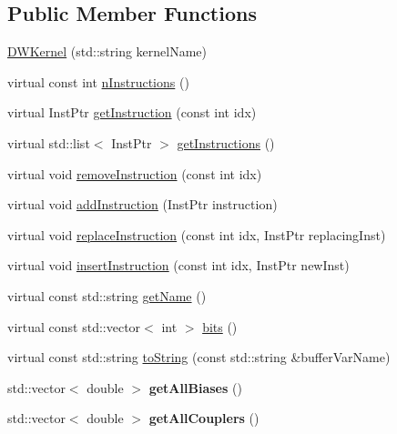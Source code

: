 \subsection*{Public Member Functions}
\begin{DoxyCompactItemize}
\item 
\hyperlink{a00032_a76a4dfadb973abbc93d1afefc6839ad8}{D\+W\+Kernel} (std\+::string kernel\+Name)
\item 
virtual const int \hyperlink{a00032_a79aecc7419a20b8779372ef36fc24806}{n\+Instructions} ()
\item 
virtual Inst\+Ptr \hyperlink{a00032_a00f23cd2e15ea6b9d00d4f3dbe1540f8}{get\+Instruction} (const int idx)
\item 
virtual std\+::list$<$ Inst\+Ptr $>$ \hyperlink{a00032_abbb8f2b1c78623c377524e45d581d018}{get\+Instructions} ()
\item 
virtual void \hyperlink{a00032_af2bcfd679e6cb89194f3f0bff8622b99}{remove\+Instruction} (const int idx)
\item 
virtual void \hyperlink{a00032_a4c3043d6971999c3a09e797fc55deb6c}{add\+Instruction} (Inst\+Ptr instruction)
\item 
virtual void \hyperlink{a00032_a75eb3560d2f81c9a5ae1cf765deb0e83}{replace\+Instruction} (const int idx, Inst\+Ptr replacing\+Inst)
\item 
virtual void \hyperlink{a00032_a1627af0141f70fc4a3cd500a13fb31b8}{insert\+Instruction} (const int idx, Inst\+Ptr new\+Inst)
\item 
virtual const std\+::string \hyperlink{a00032_a7f0c4d3c73029566561cf56a474bcbbd}{get\+Name} ()
\item 
virtual const std\+::vector$<$ int $>$ \hyperlink{a00032_adae68964db6acd8b4c2267c270a8ec58}{bits} ()
\item 
virtual const std\+::string \hyperlink{a00032_adbc3fdd080ebba20bc620b8832979f16}{to\+String} (const std\+::string \&buffer\+Var\+Name)
\item 
std\+::vector$<$ double $>$ {\bfseries get\+All\+Biases} ()\hypertarget{a00032_a9ee05b3d7689bbf837bdb7737f9745f4}{}\label{a00032_a9ee05b3d7689bbf837bdb7737f9745f4}

\item 
std\+::vector$<$ double $>$ {\bfseries get\+All\+Couplers} ()\hypertarget{a00032_a7df03ecec9c1821433daa3aa092cbd4d}{}\label{a00032_a7df03ecec9c1821433daa3aa092cbd4d}


\end{DoxyCompactItemize}
